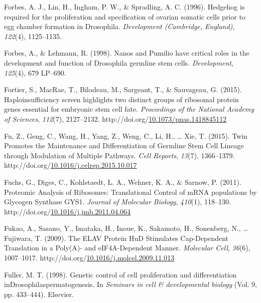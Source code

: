 \documentclass[12pt,oneside]{reedthesis}
\newlength{\cslhangindent}
\newenvironment{CSLReferences}[2] %
 {%
  \setlength{\parindent}{0pt}
  \ifodd #1 \everypar{\setlength{\hangindent}{\cslhangindent}}\ignorespaces\fi
  \ifnum #2 > 0
  \setlength{\parskip}{#2\baselineskip}
  \fi
 }%
 {}
\begin{document}
\begin{CSLReferences}{1}{0}
\leavevmode{}%
Forbes, A. J., Lin, H., Ingham, P. W., \& Spradling, A. C. (1996). Hedgehog is required for the proliferation and specification of ovarian somatic cells prior to egg chamber formation in {Drosophila}. \emph{Development (Cambridge, England)}, \emph{122}(4), 1125--1135.

\leavevmode{}%
Forbes, A., \& Lehmann, R. (1998). Nanos and {Pumilio} have critical roles in the development and function of {Drosophila} germline stem cells. \emph{Development}, \emph{125}(4), 679 LP--690.

\leavevmode{}%
Fortier, S., MacRae, T., Bilodeau, M., Sargeant, T., \& Sauvageau, G. (2015). Haploinsufficiency screen highlights two distinct groups of ribosomal protein genes essential for embryonic stem cell fate. \emph{Proceedings of the National Academy of Sciences}, \emph{112}(7), 2127--2132. http://doi.org/\href{https://doi.org/10.1073/pnas.1418845112}{10.1073/pnas.1418845112}

\leavevmode{}%
Fu, Z., Geng, C., Wang, H., Yang, Z., Weng, C., Li, H., \ldots{} Xie, T. (2015). Twin {Promotes} the {Maintenance} and {Differentiation} of {Germline Stem Cell Lineage} through {Modulation} of {Multiple Pathways}. \emph{Cell Reports}, \emph{13}(7), 1366--1379. http://doi.org/\href{https://doi.org/10.1016/j.celrep.2015.10.017}{10.1016/j.celrep.2015.10.017}

\leavevmode{}%
Fuchs, G., Diges, C., Kohlstaedt, L. A., Wehner, K. A., \& Sarnow, P. (2011). Proteomic {Analysis} of {Ribosomes}: {Translational Control} of {mRNA} populations by {Glycogen Synthase GYS1}. \emph{Journal of Molecular Biology}, \emph{410}(1), 118--130. http://doi.org/\href{https://doi.org/10.1016/j.jmb.2011.04.064}{10.1016/j.jmb.2011.04.064}

\leavevmode{}%
Fukao, A., Sasano, Y., Imataka, H., Inoue, K., Sakamoto, H., Sonenberg, N., \ldots{} Fujiwara, T. (2009). The {ELAV Protein HuD Stimulates Cap-Dependent Translation} in a {Poly}({A})- and {eIF4A-Dependent Manner}. \emph{Molecular Cell}, \emph{36}(6), 1007--1017. http://doi.org/\href{https://doi.org/10.1016/j.molcel.2009.11.013}{10.1016/j.molcel.2009.11.013}

\leavevmode{}%
Fuller, M. T. (1998). Genetic control of cell proliferation and differentiation {inDrosophilaspermatogenesis}. In \emph{Seminars in cell \& developmental biology} (Vol. 9, pp. 433--444). {Elsevier}.


\end{CSLReferences}
\end{document}
